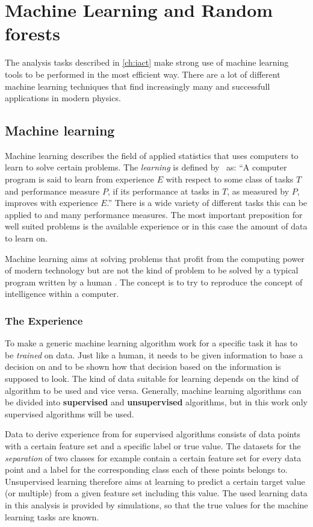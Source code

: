 \chapter{Machine Learning and Random forests}
\label{ch:ML}
%
The analysis tasks described in \autoref{ch:iact} make strong use of machine
learning tools to be performed in the most efficient way. There are a lot of
different machine learning techniques that find increasingly many and
successfull applications in modern physics.

\section{Machine learning}
%
Machine learning describes the field of applied statistics that uses computers to learn to solve certain problems. The \textit{learning} is defined by~\cite{mitchell} as: \enquote{A computer program is said to learn from experience $E$ with respect to some class of tasks $T$ and performance measure $P$, if its performance at tasks in $T$, as measured by $P$, improves with experience $E$.} There is a wide variety of different tasks this can be applied to and many performance measures. The most important preposition for well suited problems is the available experience or in this case the amount of data to learn on.

Machine learning aims at solving problems that profit from the computing power
of modern technology but are not the kind of problem to be solved by a typical
program written by a human \cite{goodfellow}. The concept is to try to
reproduce the concept of intelligence within a computer.

\subsection{The Experience}
%
To make a generic machine learning algorithm work for a specific task it has to
be \textit{trained} on data. Just like a human, it needs to be given
information to base a decision on and to be shown how that decision based on
the information is supposed to look. The kind of data suitable for learning
depends on the kind of algorithm to be used and vice versa. Generally, machine
learning algorithms can be divided into \textbf{supervised} and
\textbf{unsupervised} algorithms, but in this work only supervised algorithms
will be used.

Data to derive experience from for supervised algorithms consists of data points
with a certain feature set and a specific label or true value. The datasets for
the \textit{separation} of two classes for example contain a certain feature
set for every data point and a label for the corresponding class each of these
points belongs to. Unsupervised learning therefore aims at learning to predict
a certain target value (or multiple) from a given feature set including this
value. The used learning data in this analysis is provided by simulations, so
that the true values for the machine learning tasks are known.


